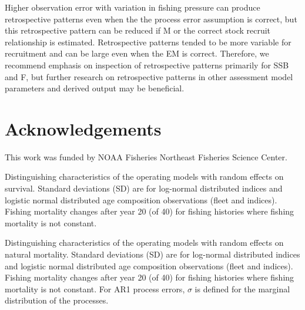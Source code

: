 \documentclass[
  12pt,
]{article}
\newlength{\cslhangindent}
\newlength{\cslentryspacingunit} %
\newenvironment{CSLReferences}[2] %
 {%
  \setlength{\parindent}{0pt}
  \ifodd #1
  \let\oldpar\par
  \def\par{\hangindent=\cslhangindent\oldpar}
  \fi
  \setlength{\parskip}{#2\cslentryspacingunit}
 }%
 {}
\begin{document}
Higher observation error with variation in fishing pressure can produce
retrospective patterns even when the the process error assumption is
correct, but this retrospective pattern can be reduced if M or the
correct stock recruit relationship is estimated. Retrospective patterns
tended to be more variable for recruitment and can be large even when
the EM is correct. Therefore, we recommend emphasis on inspection of
retrospective patterns primarily for SSB and F, but further research on
retrospective patterns in other assessment model parameters and derived
output may be beneficial.

\hypertarget{acknowledgements}{%
\section*{Acknowledgements}\label{acknowledgements}}

This work was funded by NOAA Fisheries Northeast Fisheries Science
Center.

\pagebreak



\hypertarget{refs}{}
\begin{CSLReferences}{0}{0}
\end{CSLReferences}

\pagebreak

\begin{landscape}
\begin{table}
\caption{Distinguishing characteristics of the operating models with random effects on survival. Standard deviations (SD) are for log-normal distributed indices and logistic normal distributed age composition observations (fleet and indices). Fishing mortality changes after year 20 (of 40) for fishing histories where fishing mortality is not constant.}\label{naa_om_table}
{\footnotesize }
\end{table}
\end{landscape}

\begin{landscape}
\begin{table}
\caption{Distinguishing characteristics of the operating models with random effects on natural mortality. Standard deviations (SD) are for log-normal distributed indices and logistic normal distributed age composition observations (fleet and indices). Fishing mortality changes after year 20 (of 40) for fishing histories where fishing mortality is not constant. For AR1 process errors, $\sigma$ is defined for the marginal distribution of the processes.}\label{M_om_table}
{}
\end{table}
\end{landscape}
\end{document}
